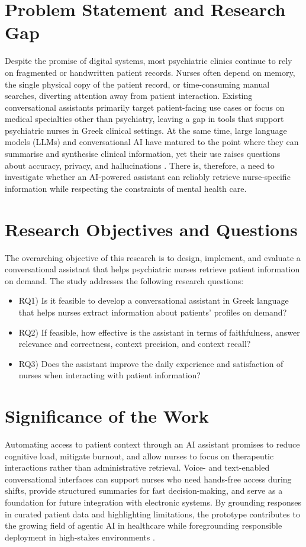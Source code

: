 \section{Problem Statement and Research Gap}
Despite the promise of digital systems, most psychiatric clinics continue to rely on fragmented or handwritten patient records. Nurses often depend on memory, the single physical copy of the patient record, or time-consuming manual searches, diverting attention away from patient interaction. Existing conversational assistants primarily target patient-facing use cases or focus on medical specialties other than psychiatry, leaving a gap in tools that support psychiatric nurses in Greek clinical settings. At the same time, large language models (LLMs) and conversational AI have matured to the point where they can summarise and synthesise clinical information, yet their use raises questions about accuracy, privacy, and hallucinations \cite{llmsmodernmedicine2023, opportunitiesrisks2024, raglewisetal2021}. There is, therefore, a need to investigate whether an AI-powered assistant can reliably retrieve nurse-specific information while respecting the constraints of mental health care.

\section{Research Objectives and Questions}
The overarching objective of this research is to design, implement, and evaluate a conversational assistant that helps psychiatric nurses retrieve patient information on demand. The study addresses the following research questions:\label{chap:introduction-rqs}
\begin{itemize}
    \item RQ1) Is it feasible to develop a conversational assistant in Greek language that helps nurses extract information about patients' profiles on demand?
    \item RQ2) If feasible, how effective is the assistant in terms of faithfulness, answer relevance and correctness, context precision, and context recall?
    \item RQ3) Does the assistant improve the daily experience and satisfaction of nurses when interacting with patient information?
\end{itemize}

\section{Significance of the Work}
Automating access to patient context through an AI assistant promises to reduce cognitive load, mitigate burnout, and allow nurses to focus on therapeutic interactions rather than administrative retrieval. Voice- and text-enabled conversational interfaces can support nurses who need hands-free access during shifts, provide structured summaries for fast decision-making, and serve as a foundation for future integration with electronic systems. By grounding responses in curated patient data and highlighting limitations, the prototype contributes to the growing field of agentic AI in healthcare while foregrounding responsible deployment in high-stakes environments \cite{clinicalentityIE2025}.


